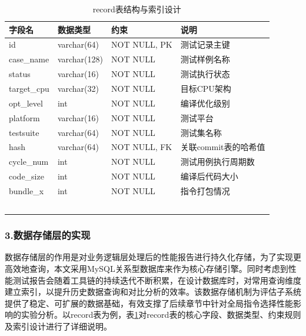 \begin{table}[htbp]
	\centering
	\caption{record表结构与索引设计}
	\label{tab:record_struct}
	
	\renewcommand{\arraystretch}{1.2}
	{\footnotesize
		\begin{tabularx}{\linewidth}{
				>{\raggedright\arraybackslash}m{1cm}
				>{\centering\arraybackslash}X
				>{\centering\arraybackslash}X
				>{\centering\arraybackslash}X
			}
			\toprule
			\textbf{字段名} & \textbf{数据类型} & \textbf{约束} & \textbf{说明} \\
			\midrule
			id & varchar(64) & NOT NULL, PK & 测试记录主键 \\
			case\_name & varchar(128) & NOT NULL & 测试样例名称 \\
			status & varchar(16) & NOT NULL & 测试执行状态 \\
			target\_cpu & varchar(32) & NOT NULL & 目标CPU架构 \\
			opt\_level & int & NOT NULL & 编译优化级别 \\
			platform & varchar(16) & NOT NULL & 测试平台 \\
			testsuite & varchar(64) & NOT NULL & 测试集名称 \\
			hash & varchar(64) & NOT NULL, FK & 关联commit表的哈希值 \\
			cycle\_num & int & NOT NULL & 测试用例执行周期数 \\
			code\_size & int & NOT NULL & 编译后代码大小 \\
			bundle\_x & int & NOT NULL & 指令打包情况 \\
			\midrule
			\multicolumn{4}{l}{\textbf{索引说明：}} \\
			\multicolumn{4}{l}{1. PRIMARY (id)：主键索引，加速单条测试记录的查询与修改；} \\
			\multicolumn{4}{l}{2. fk\_record\_commit\_hash (hash)：外键索引，加速提交与测试记录的关联查询；} \\
			\multicolumn{4}{l}{3. idx\_record\_for\_assembly\_fk (target\_cpu, opt\_level, testsuite, case\_name)：复合索引，优化汇编关联查询；} \\
			\multicolumn{4}{l}{4. idx\_record\_for\_stats (target\_cpu, platform, opt\_level, testsuite, hash)：复合索引，加速性能统计类查询。} \\
			\bottomrule
		\end{tabularx}
	}
\end{table}

\subsubsection{3.数据存储层的实现}
数据存储层的作用是对业务逻辑层处理后的性能报告进行持久化存储，为了实现更高效地查询，本文采用MySQL关系型数据库来作为核心存储引擎。同时考虑到性能测试报告会随着工具链的持续迭代不断积累，在设计数据库时，对常用查询维度建立索引，以提升历史数据查询和对比分析的效率。该数据存储机制为评估子系统提供了稳定、可扩展的数据基础，有效支撑了后续章节中针对全局指令选择性能影响的实验分析。以record表为例，表\ref{tab:record_struct}对record表的核心字段、数据类型、约束规则及索引设计进行了详细说明。


